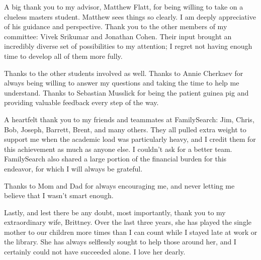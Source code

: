 

A big thank you to my advisor, Matthew Flatt, for being willing to take on a clueless masters student. Matthew sees things so clearly. I am deeply appreciative of his guidance and perspective. Thank you to the other members of my committee: Vivek Srikumar and Jonathan Cohen. Their input brought an incredibly diverse set of possibilities to my attention; I regret not having enough time to develop all of them more fully.

Thanks to the other students involved as well. Thanks to Annie Cherkaev for always being willing to answer my questions and taking the time to help me understand. Thanks to Sebastian Musslick for being the patient guinea pig and providing valuable feedback every step of the way.

A heartfelt thank you to my friends and teammates at FamilySearch: Jim, Chris, Bob, Joseph, Barrett, Brent, and many others. They all pulled extra weight to support me when the academic load was particularly heavy, and I credit them for this achievement as much as anyone else. I couldn't ask for a better team. FamilySearch also shared a large portion of the financial burden for this endeavor, for which I will always be grateful.

Thanks to Mom and Dad for always encouraging me, and never letting me believe that I wasn't smart enough.

Lastly, and lest there be any doubt, most importantly, thank you to my extraordinary wife, Brittney. Over the last three years, she has played the single mother to our children more times than I can count while I stayed late at work or the library. She has always selflessly sought to help those around her, and I certainly could not have succeeded alone. I love her dearly.

